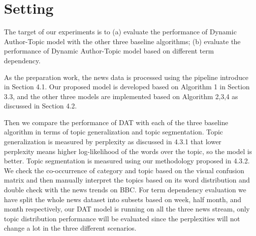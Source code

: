 \section{Setting}

The target of our experiments is to (a) evaluate the performance of Dynamic Author-Topic model with the other three baseline algorithms; (b) evaluate the performance of Dynamic Author-Topic model based on different term dependency. 

As the preparation work, the news data is processed using the pipeline introduce in Section 4.1. Our proposed model is developed based on Algorithm 1 in Section 3.3, and the other three models are implemented based on Algorithm 2,3,4 as discussed in Section 4.2. 

Then we compare the performance of DAT with each of the three baseline algorithm in terms of topic generalization and topic segmentation. Topic generalization is measured by perplexity as discussed in 4.3.1 that lower perplexity means higher log-likelihood of the words over the topic, so the model is better. Topic segmentation is measured using our methodology proposed in 4.3.2. We check the co-occurrence of category and topic based on the visual confusion matrix and then manually interpret the topics based on its word distribution and double check with the news trends on BBC. 
For term dependency evaluation we have split the whole news dataset into subsets based on week, half month, and month respectively, our DAT model is running on all the three news stream, only topic distribution performance will be evaluated since the perplexities will not change a lot in the three different scenarios.

